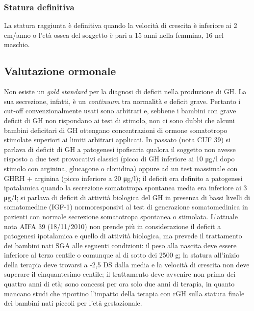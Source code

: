 \subsubsection*{Statura definitiva}
La statura raggiunta è definitiva quando la velocità di crescita è inferiore ai 2 cm/anno o l'età ossea del soggetto è pari a 15 anni nella femmina, 16 nel maschio.


\clearpage

\subsection{Valutazione ormonale}

Non esiste un \emph{gold standard} per la diagnosi di deficit nella produzione di GH\cite{gh2003update}. La sua secrezione, infatti, è un \emph{continuum} tra normalità e deficit grave. Pertanto i cut-off convenzionalmente usati sono arbitrari e, sebbene i bambini con grave deficit di GH non rispondano ai test di stimolo, non ci sono dubbi che alcuni bambini deficitari di GH ottengano concentrazioni di ormone somatotropo stimolate superiori ai limiti arbitrari applicati.
In passato (nota CUF 39) si parlava di deficit di GH a patogenesi ipofisaria qualora il soggetto non avesse risposto a due test provocativi classici (picco di GH inferiore ai 10 \unit{\micro g}/l dopo stimolo con arginina, glucagone o clonidina) oppure ad un test massimale con GHRH + arginina (picco inferiore a 20 \unit{\micro g}/l); il deficit era definito a patogenesi ipotalamica quando la secrezione somatotropa spontanea media era inferiore ai 3 \unit{\micro g}/l; si parlava di deficit di attività biologica del GH in presenza di bassi livelli di somatomedine (IGF-1) normoresponsivi al test di generazione somatomedinica in pazienti con normale secrezione somatotropa spontanea o stimolata.
L'attuale nota AIFA 39 (18/11/2010) non prende più in considerazione il deficit a patogenesi ipotalamica e quello di attività biologica, ma prevede il trattamento dei bambini nati SGA alle seguenti condizioni: il peso alla nascita deve essere inferiore al terzo centile o comunque al di sotto dei 2500 g; la statura all'inizio della terapia deve trovarsi a -2,5 DS dalla media e la velocità di crescita non deve superare il cinquantesimo centile; il trattamento deve avvenire non prima dei quattro anni di età; sono concessi per ora solo due anni di terapia, in quanto mancano studi che riportino l'impatto della terapia con rGH sulla statura finale dei bambini nati piccoli per l'età gestazionale.

